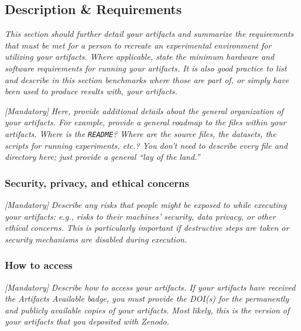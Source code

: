 \documentclass[sigconf]{acmart}
\begin{document}
	
	\subsection{Description \& Requirements}
	
	\emph{This section should further detail your artifacts and summarize
		the requirements that must be met for a person to recreate an
		experimental environment for utilizing your artifacts.  Where
		applicable, state the minimum hardware and software requirements for
		running your artifacts.  It is also good practice to list and describe
		in this section benchmarks where those are part of, or simply have
		been used to produce results with, your artifacts.}
	
	\emph{[Mandatory]}
	\emph{Here, provide additional details about the general organization
		of your artifacts.  For example, provide a general roadmap to the
		files within your artifacts.  Where is the \texttt{README}?  Where are
		the source files, the datasets, the scripts for running experiments,
		etc.?  You don't need to describe every file and directory here; just
		provide a general ``lay of the land.''}
	
	
	\subsubsection{Security, privacy, and ethical concerns}
	
	\emph{[Mandatory]}
	\emph{Describe any risks that people might be exposed to while
		executing your artifacts: e.g., risks to their machines' security,
		data privacy, or other ethical concerns.  This is particularly
		important if destructive steps are taken or security mechanisms are
		disabled during execution.}
	
	
	\subsubsection{How to access}
	
	\emph{[Mandatory]}
	\emph{Describe how to access your artifacts.  If your artifacts have
		received the \emph{Artifacts Available} badge, you must provide the
		DOI(s) for the permanently and publicly available copies of your
		artifacts.  Most likely, this is the version of your artifacts that
		you deposited with Zenodo.}
	
\end{document}
